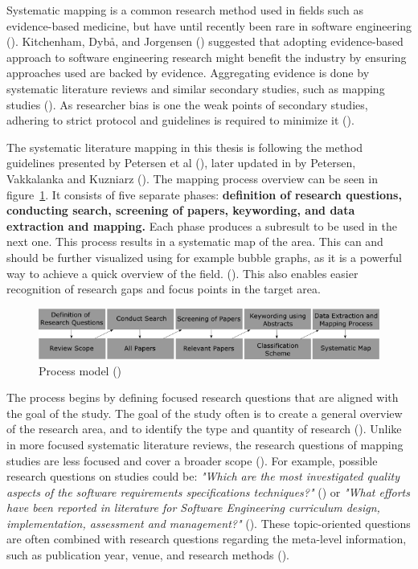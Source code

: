 \documentclass[utf8,english]{gradu3}
\begin{document}
Systematic mapping is a common research method used in fields such as
evidence-based medicine, but have until recently been rare in software
engineering (\cite{petersen2008}). Kitchenham, Dybå, and Jorgensen
(\cite*{kitchenham2004}) suggested that adopting evidence-based approach to
software engineering research might benefit the industry by ensuring approaches
used are backed by evidence. Aggregating evidence is done by systematic
literature reviews and similar secondary studies, such as mapping studies
(\cite{kitchenham2010}). As researcher bias is one the weak points of secondary
studies, adhering to strict protocol and guidelines is required to minimize it
(\cite{brereton2007}).


The systematic literature mapping in this thesis is following the method
guidelines presented by Petersen et al (\cite*{petersen2008}), later updated in
by Petersen, Vakkalanka and Kuzniarz (\cite*{petersen2015}). The mapping process
overview can be seen in figure~\ref{fig:mapping}. It consists of five separate
phases: \textbf{definition of research questions, conducting search, screening
  of papers, keywording, and data extraction and mapping.} Each phase produces a
subresult to be used in the next one. This process results in a systematic map
of the area. This can and should be further visualized using for example bubble
graphs, as it is a powerful way to achieve a quick overview of the field.
(\cite{petersen2008}). This also enables easier recognition of research gaps and
focus points in the target area.


\begin{figure}[h]
  \includegraphics[width=\linewidth]{images/method_graph_L.png}
  \caption{Process model (\cite{petersen2008})}
  \label{fig:mapping}
\end{figure}

The process begins by defining focused research questions that are aligned with
the goal of the study. The goal of the study often is to create a general
overview of the research area, and to identify the type and quantity of research
(\cite{petersen2008}). Unlike in more focused systematic literature reviews, the
research questions of mapping studies are less focused and cover a broader scope
(\cite{kitchenham2010}). For example, possible research questions on studies
could be: \emph{"Which are the most investigated quality aspects of the software
  requirements specifications techniques?"} (\cite{condori2009}) or \emph{"What
  efforts have been reported in literature for Software Engineering curriculum
  design, implementation, assessment and management?"} (\cite{qadir2011}). These
topic-oriented questions are often combined with research questions regarding
the meta-level information, such as publication year, venue, and research
methods (\cite{petersen2015}).
\end{document}
